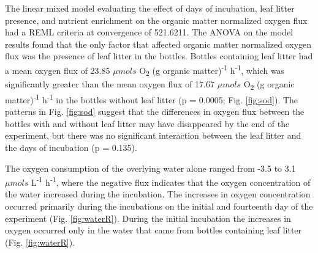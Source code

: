 The linear mixed model evaluating the effect of days of incubation, leaf litter presence, and nutrient enrichment on the organic matter normalized oxygen flux had a REML criteria at convergence of 521.6211. The ANOVA on the model results found that the only factor that affected organic matter normalized oxygen flux was the presence of leaf litter in the bottles. Bottles containing leaf litter had a mean oxygen flux of 23.85 $\mu mols$ O\textsubscript{2} (g organic matter)\textsuperscript{-1} h\textsuperscript{-1}, which was significantly greater than the mean oxygen flux of 17.67 $\mu mols$ O\textsubscript{2} (g organic matter)\textsuperscript{-1} h\textsuperscript{-1} in the bottles without leaf litter (p = 0.0005; Fig. \ref{fig:sod}). The patterns in Fig. \ref{fig:sod} suggest that the differences in oxygen flux between the bottles with and without leaf litter may have disappeared by the end of the experiment, but there was no significant interaction between the leaf litter and the days of incubation (p = 0.135).

The oxygen consumption of the overlying water alone ranged from -3.5 to 3.1 $\mu mols$ L\textsuperscript{-1} h\textsuperscript{-1}, where the negative flux indicates that the oxygen concentration of the water increased during the incubation.  The increases in oxygen concentration occurred primarily during the incubations on the initial and fourteenth day of the experiment (Fig. \ref{fig:waterR}). During the initial incubation the increases in oxygen occurred only in the water that came from bottles containing leaf litter (Fig. \ref{fig:waterR}).




    